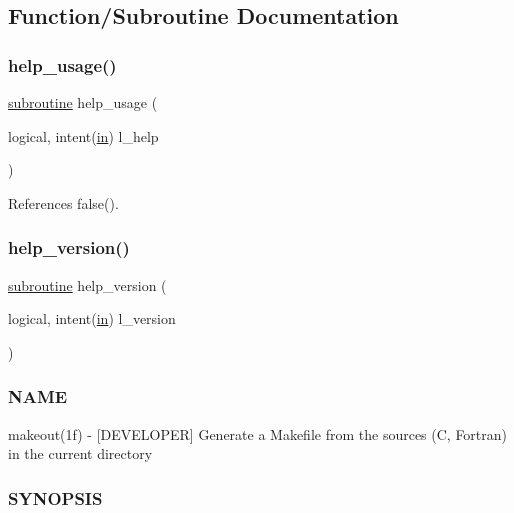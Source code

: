 \subsection{Function/\+Subroutine Documentation}
\mbox{\label{makeout_8f90_a3e09a3b52ee8fb04eeb93fe5761626a8}} 
\subsubsection{\texorpdfstring{help\+\_\+usage()}{help\_usage()}}
{\footnotesize\ttfamily \hyperlink{M__stopwatch_83_8txt_acfbcff50169d691ff02d4a123ed70482}{subroutine} help\+\_\+usage (\begin{DoxyParamCaption}\item[{logical, intent(\hyperlink{M__journal_83_8txt_afce72651d1eed785a2132bee863b2f38}{in})}]{l\+\_\+help }\end{DoxyParamCaption})}



References false().

\mbox{\label{makeout_8f90_a39c21619b08a3c22f19e2306efd7f766}} 
\subsubsection{\texorpdfstring{help\+\_\+version()}{help\_version()}}
{\footnotesize\ttfamily \hyperlink{M__stopwatch_83_8txt_acfbcff50169d691ff02d4a123ed70482}{subroutine} help\+\_\+version (\begin{DoxyParamCaption}\item[{logical, intent(\hyperlink{M__journal_83_8txt_afce72651d1eed785a2132bee863b2f38}{in})}]{l\+\_\+version }\end{DoxyParamCaption})}



\subsubsection*{N\+A\+ME}

makeout(1f) -\/ \mbox{[}D\+E\+V\+E\+L\+O\+P\+ER\mbox{]} Generate a Makefile from the sources (C, Fortran) in the current directory \subsubsection*{S\+Y\+N\+O\+P\+S\+IS}

